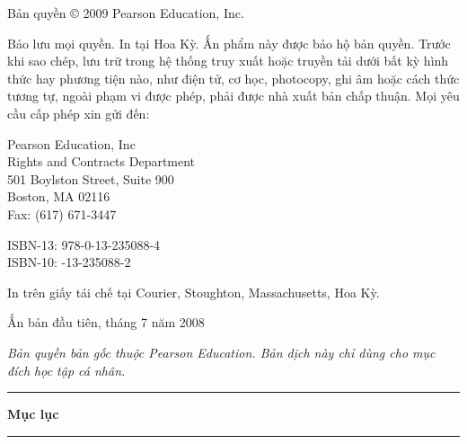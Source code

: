 \documentclass[10pt,twoside,openright]{book}
\makeatletter
\renewcommand{\cleardoublepage}{\clearpage}
\def\cc@pretop{-2.6pt}
\def\cc@fr@afterA{0.3pt}
\def\cc@fr@afterB{12.7pt}
\def\cc@fr@bodygap{35.6pt}
\def\@makeschapterhead#1{%
  \vspace*{\cc@pretop}%
  {\parindent\z@\raggedleft
    \rule{\textwidth}{0.75pt}\par
    \addvspace{\cc@fr@afterA}%
    {\fontsize{36}{40}\selectfont\bfseries #1\par}%
    \addvspace{\cc@fr@afterB}%
    \rule{\textwidth}{0.75pt}\par
    \addvspace{\cc@fr@bodygap}%
  }%
  \par\nobreak
  \setcounter{footnote}{0}%
}
\renewcommand{\contentsname}{Mục lục}
\newcommand{\cctableofcontents}{%
  \cleardoublepage
  \thispagestyle{plain}%
  \markboth{\contentsname}{\contentsname}%
  \@makeschapterhead{\contentsname}%
  \@starttoc{toc}%
}
\makeatother
\begin{document}
\vspace{5pt}
\noindent Bản quyền \copyright{} 2009 Pearson Education, Inc.\par
\vspace{5pt}
\noindent Bảo lưu mọi quyền. In tại Hoa Kỳ. Ấn phẩm này được bảo hộ bản quyền.
Trước khi sao chép, lưu trữ trong hệ thống truy xuất hoặc truyền tải dưới bất
kỳ hình thức hay phương tiện nào, như điện tử, cơ học, photocopy, ghi âm hoặc
cách thức tương tự, ngoài phạm vi được phép, phải được nhà xuất bản chấp thuận.
Mọi yêu cầu cấp phép xin gửi đến:\par
\vspace{3pt}
\hspace*{20pt}Pearson Education, Inc\\
\hspace*{20pt}Rights and Contracts Department\\
\hspace*{20pt}501 Boylston Street, Suite 900\\
\hspace*{20pt}Boston, MA 02116\\
\hspace*{20pt}Fax: (617) 671-3447\par
\vspace{5pt}
\noindent ISBN-13: 978-0-13-235088-4\\
ISBN-10: -13-235088-2\par
\vspace{5pt}
\noindent In trên giấy tái chế tại Courier, Stoughton, Massachusetts, Hoa Kỳ.\par
\vspace{5pt}
\noindent Ấn bản đầu tiên, tháng 7 năm 2008\par
\vspace{12pt}
\noindent\textit{Bản quyền bản gốc thuộc Pearson Education. Bản dịch này chỉ dùng
cho mục đích học tập cá nhân.}\par
\endgroup

\cctableofcontents



\mainmatter


\backmatter

\end{document}
